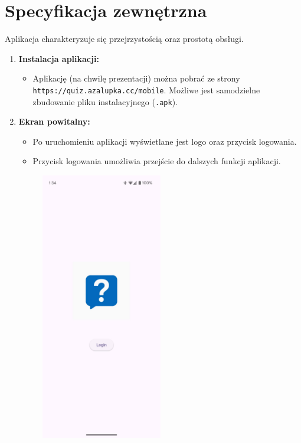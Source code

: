 \documentclass{article}
\begin{document}
\section{Specyfikacja zewnętrzna}
Aplikacja charakteryzuje się przejrzystością oraz prostotą obsługi.
\begin{enumerate}
\item \textbf{Instalacja aplikacji:} \\
\begin{itemize}
	\item Aplikację (na chwilę prezentacji) można pobrać ze strony \texttt{https://quiz.azalupka.cc/mobile}. Możliwe jest samodzielne zbudowanie pliku instalacyjnego (\texttt{.apk}).
\end{itemize}
\item \textbf{Ekran powitalny:} \\
	\begin{minipage}{0.5\textwidth}
		\begin{itemize}
			\item Po uruchomieniu aplikacji wyświetlane jest logo oraz przycisk logowania.
			\item Przycisk logowania umożliwia przejście do dalszych funkcji aplikacji.
		\end{itemize}
	\end{minipage}
	\begin{minipage}{0.5\textwidth}
		\begin{figure}[H]
			\centering
			\includegraphics[width=0.5\textwidth]{../_assets/mobile/welcome.jpeg}

\end{figure}
\end{minipage}
\end{enumerate}
\end{document}
